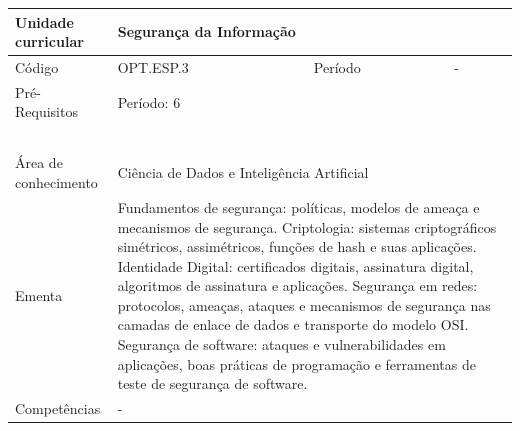 \clearpage
\newpage

\begin{quadro}[ht!]
  \centering\scriptsize
\caption{Unidade Curricular Segurança da Informação}

\begin{tabular}{|p{2.5cm}|p{2.5cm}|p{2.5cm}|p{2.5cm}|p{2.5cm}|}\hline

  Unidade curricular & \multicolumn{4}{p{10cm}|}{ Segurança da Informação }\\\hline
  Código & OPT.ESP.3 & Período & \multicolumn{2}{p{5cm}|}{ - }\\\hline
  Pré-Requisitos & \multicolumn{4}{p{10cm}|}{ Período: 6 } \\\hline
  \cellcolor{blue1}{ CH PRESENCIAL } &
    \cellcolor{blue1}{CH EAD Síncrona} &
    \cellcolor{blue1}{CH EAD Síncrona Mediada} &
    \cellcolor{blue1}{CH EAD Assíncrona} &
    \cellcolor{blue1}{CH APCC} \\\hline
  \cellcolor{blue1}{ 60 } &
    \cellcolor{blue1}{ 0 } &
    \cellcolor{blue1}{ 30 } &
    \cellcolor{blue1}{ 30 } &
    \cellcolor{blue1}{0} \\\hline
  \cellcolor{blue1}{ CH Teórica } &
    \cellcolor{blue1}{CH Prática} &
    \cellcolor{blue1}{CH Humanidades} &
    \cellcolor{blue1}{CH Extensão} &
    \cellcolor{blue1}{CH EAD TOTAL} \\\hline
  \cellcolor{blue1}{ 30 } &
    \cellcolor{blue1}{ 30 } &
    \cellcolor{blue1}{ 0 } &
    \cellcolor{blue1}{ 0 } &
    \cellcolor{blue1}{ 60 } \\\hline
  \cellcolor{blue1}{CARGA-HORÁRIA TOTAL} & \multicolumn{4}{p{10cm}|}{ \cellcolor{blue1}{ 60 } } \\\hline
  Área de conhecimento & \multicolumn{4}{p{10cm}|}{ Ciência de Dados e Inteligência Artificial } \\\hline
  Ementa & \multicolumn{4}{p{10cm}|}{ Fundamentos de segurança: políticas, modelos de ameaça e mecanismos de segurança. Criptologia: sistemas criptográficos simétricos, assimétricos, funções de hash e suas aplicações. Identidade Digital: certificados digitais, assinatura digital, algoritmos de assinatura e aplicações. Segurança em redes: protocolos, ameaças, ataques e mecanismos de segurança nas camadas de enlace de dados e transporte do modelo OSI. Segurança de software: ataques e vulnerabilidades em aplicações, boas práticas de programação e ferramentas de teste de segurança de software. } \\\hline
  Competências & \multicolumn{4}{p{10cm}|}{ - } \\\hline


  
	\end{tabular}

\end{quadro}


